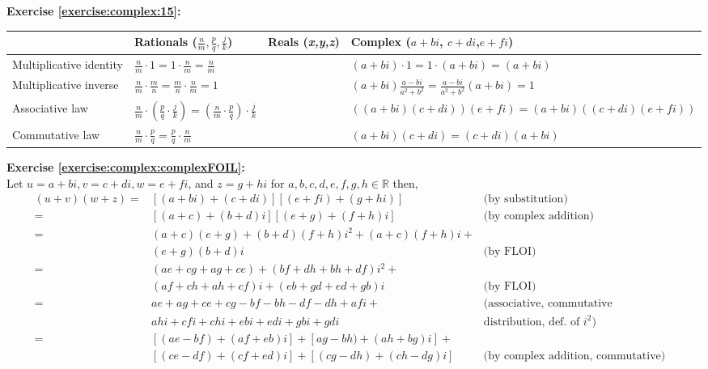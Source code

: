 \noindent\textbf{Exercise \ref{exercise:complex:15}:}%
\begin{table}[H]
\begin{tabular}{|p{2.8cm}|p{2.0cm}|p{2.6 cm}|p{2.8cm}|}
\hline 
\rule{0pt}{2.6ex} & Rationals ($\frac{n}{m},\frac{p}{q},\frac{j}{k}$)  & Reals (\emph{x,y,z})  & Complex ($a+bi$, $c+di$,$e+fi$)\rule[-1.2ex]{0pt}{0pt}\tabularnewline
\hline
\hline 
\rule{0pt}{2.6ex} Multiplicative identity  &$\frac{n}{m} \cdot 1 = 1 \cdot \frac{n}{m} = \frac{n}{m}$  & & $(a + bi) \cdot 1 = 1 \cdot (a + bi) = (a + bi)$ \rule[-1.2ex]{0pt}{0pt} \tabularnewline
\hline 
\rule{0pt}{2.6ex} Multiplicative inverse  &  $\frac{n}{m} \cdot \frac{m}{n} = \frac{m}{n} \cdot \frac{n}{m} = 1$ & &  $(a + bi) \frac{a - bi}{a^{2} + b^{2}}= \frac{a - bi}{a^{2} + b^{2}}(a + bi)=1$ \rule[-1.2ex]{0pt}{0pt} \tabularnewline
\hline 
\rule{0pt}{2.6ex} Associative law  & $\frac{n}{m}\cdot\left(\frac{p}{q}\cdot\frac{j}{k}\right) = \left(\frac{n}{m}\cdot\frac{p}{q}\right)\cdot\frac{j}{k}$ & & $((a+bi)(c+di))(e+fi) = (a+bi)((c+di)(e+fi))$ \rule[-1.2ex]{0pt}{0pt} \tabularnewline
\hline 
\rule{0pt}{2.6ex} Commutative law  & $\frac{n}{m}\cdot\frac{p}{q}= \frac{p}{q}\cdot\frac{n}{m}$ & & $(a+bi)(c+di)=(c+di)(a+bi)$ \rule[-1.2ex]{0pt}{0pt} \tabularnewline
\hline
\end{tabular}
\end{table}

\noindent\textbf{Exercise \ref{exercise:complex:complexFOIL}:}%
\\
Let $u = a + bi, v = c + di, w = e + fi$, and $z = g + hi$ for $a, b, c, d, e, f, g, h \in {\mathbb R}$ then,
\begin{align*}
(u + v)(w + z) = &[(a + bi) + (c + di)][(e + fi) + (g + hi)]&  \text{(by substitution)}&\\
= &[(a + c) + (b + d)i][(e + g) + (f + h)i]&  \text{(by complex addition)}&\\
= &(a + c)(e + g) + (b + d)(f + h)i^2 + (a + c)(f + h)i + \\
&(e + g)(b + d)i& \text{(by FLOI)}&\\
= &(ae + cg + ag + ce) + (bf + dh + bh + df)i^2 +\\
&(af + ch + ah + cf)i + (eb + gd + ed + gb)i& \text{(by FLOI)}&\\
= &ae + ag + ce + cg - bf - bh - df - dh + afi + & \text{(associative, commutative}\\
&ahi + cfi + chi + ebi + edi + gbi + gdi& \text{distribution, def. of } i^2)\\
= &[(ae - bf) + (af + eb)i] + [ag -bh) + (ah + bg)i] +\\
&[(ce - df) + (cf + ed)i] + [(cg - dh) + (ch - dg)i]& \text{(by complex addition, commutative)}\\
\end{align*}


